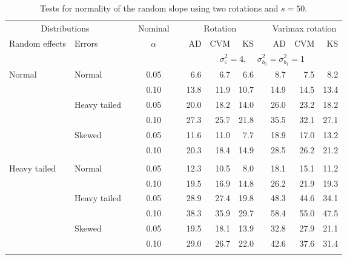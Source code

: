 \begin{table}[ht]
\caption{\label{tab:simb1s50-alt}Tests for normality of the random slope using two rotations and $s = 50$.}
\begin{scriptsize}
\begin{center}
\begin{tabular}{ll p{.1cm} c p{.1cm} rrr p{.1cm} rrr}
  \hline
  \multicolumn{2}{c}{Distributions}& & Nominal & &  \multicolumn{3}{c}{Rotation} & & \multicolumn{3}{c}{Varimax rotation} \\ \cline{1-2} \cline{6-8} \cline{10-12}   
  Random effects & Errors & & $\alpha$ & & AD & CVM & KS & & AD & CVM & KS \\ 
   \hline
& && && \multicolumn{7}{c}{$\sigma_{\varepsilon}^2 = 4$, \ \ $\sigma_{b_0}^2 = \sigma_{b_1}^2 = 1$} \\ \cline{6-12}
\rowcolor{gray!20}Normal       & Normal       && 0.05 &&   6.6 & 6.7 & 6.6 &   & 8.7 & 7.5 & 8.2 \\ 
\rowcolor{gray!20}             &              && 0.10 &&   13.8 & 11.9 & 10.7 &   & 14.9 & 14.5 & 13.4 \\ 
\rowcolor{gray!20}             & Heavy tailed && 0.05 &&   20.0 & 18.2 & 14.0 &   & 26.0 & 23.2 & 18.2 \\ 
\rowcolor{gray!20}             &              && 0.10 &&   27.3 & 25.7 & 21.8 &   & 35.5 & 32.1 & 27.1 \\ 
\rowcolor{gray!20}             & Skewed       && 0.05 &&   11.6 & 11.0 & 7.7 &   & 18.9 & 17.0 & 13.2 \\ 
\rowcolor{gray!20}             &              && 0.10 &&   20.3 & 18.4 & 14.9 &   & 28.5 & 26.2 & 21.2 \\ 
&&&&&&&&&&&\\
Heavy tailed & Normal       && 0.05 &&   12.3 & 10.5 & 8.0 &   & 18.1 & 15.1 & 11.2 \\ 
             &              && 0.10 &&   19.5 & 16.9 & 14.8 &   & 26.2 & 21.9 & 19.3 \\ 
             & Heavy tailed && 0.05 &&   28.9 & 27.4 & 19.8 &   & 48.3 & 44.6 & 34.1 \\ 
             &              && 0.10 &&   38.3 & 35.9 & 29.7 &   & 58.4 & 55.0 & 47.5 \\ 
             & Skewed       && 0.05 &&   19.5 & 18.1 & 13.9 &   & 32.8 & 27.9 & 21.1 \\ 
             &              && 0.10 &&   29.0 & 26.7 & 22.0 &   & 42.6 & 37.6 & 31.4 \\ 
&&&&&&&&&&&\\

\end{tabular}
\end{center}
\end{scriptsize}
\end{table}
